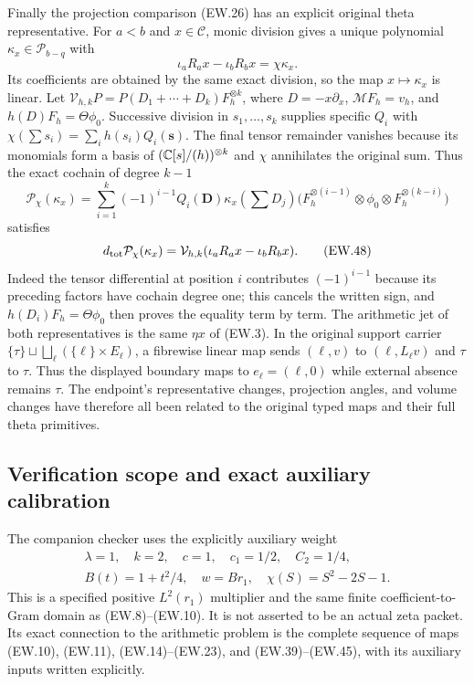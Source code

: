 Finally the projection comparison (EW.26) has an explicit original
theta representative. For $a<b$ and $x\in\mathcal C$, monic
division gives a unique polynomial $\kappa_x\in\mathcal P_{b-q}$
with
\[
 \iota_aR_ax-\iota_bR_bx=\chi\kappa_x.                       \tag{EW.46}
\]
Its coefficients are obtained by the same exact division, so the
map $x\mapsto\kappa_x$ is linear. Let
$\mathcal V_{h,k}P=P(D_1+\cdots+D_k)F_h^{\otimes k}$, where
$D=-x\partial_x$, $\mathcal MF_h=v_h$, and
$h(D)F_h=\Theta\phi_0$. Successive division in
$s_1,\ldots,s_k$ supplies specific $Q_i$ with
$\chi(\sum s_i)=\sum_i h(s_i)Q_i(\mathbf s)$.
The final tensor remainder vanishes because its monomials form a
basis of $(\mathbb{C}[s]/(h))^{\otimes k}$ and $\chi$ annihilates
the original sum. Thus the exact cochain of degree $k-1$
\[
 \mathcal P_\chi(\kappa_x)=
 \sum_{i=1}^k(-1)^{i-1}Q_i(\mathbf D)\kappa_x(\textstyle\sum D_j)
 \bigl(F_h^{\otimes(i-1)}\otimes\phi_0\otimes
                         F_h^{\otimes(k-i)}\bigr)            \tag{EW.47}
\]
satisfies
\[
 d_{\rm tot}\mathcal P_\chi(\kappa_x)
   =\mathcal V_{h,k}(\iota_aR_ax-\iota_bR_bx).                \tag{EW.48}
\]
Indeed the tensor differential at position $i$ contributes
$(-1)^{i-1}$ because its preceding factors have cochain degree
one; this cancels the written sign, and $h(D_i)F_h=\Theta\phi_0$
then proves the equality term by term. The arithmetic jet of both
representatives is the same $\eta x$ of (EW.3). In the original
support carrier $\{\tau\}\sqcup\bigsqcup_\ell(\{\ell\}\times E_\ell)$,
a fibrewise linear map sends $(\ell,v)$ to $(\ell,L_\ell v)$
and $\tau$ to $\tau$. Thus the displayed boundary maps to
$e_\ell=(\ell,0)$ while external absence remains $\tau$.
The endpoint's representative changes, projection angles, and volume
changes have therefore all been related to the original typed maps
and their full theta primitives.

\subsection{Verification scope and exact auxiliary calibration}

The companion checker uses the explicitly auxiliary weight
\[
 \begin{gathered}
 \lambda=1,\quad k=2,\quad c=1,\quad c_1=1/2,\quad C_2=1/4,\\
 B(t)=1+t^2/4,\quad w=B r_1,\quad\chi(S)=S^2-2S-1.
 \end{gathered}                                               \tag{EW.49}
\]
This is a specified positive $L^2(r_1)$ multiplier and the same
finite coefficient-to-Gram domain as (EW.8)--(EW.10). It is not
asserted to be an actual zeta packet. Its exact connection to the
arithmetic problem is the complete sequence of maps (EW.10),
(EW.11), (EW.14)--(EW.23), and (EW.39)--(EW.45), with its
auxiliary inputs written explicitly.

